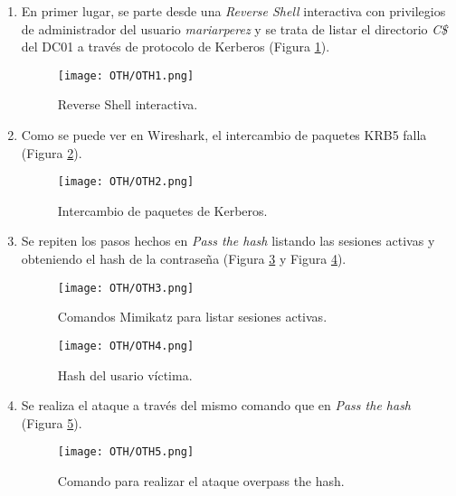 \begin{enumerate}
\item En primer lugar, se parte desde una {\it Reverse Shell} interactiva con privilegios de administrador del usuario {\it mariarperez} y se trata de listar el directorio {\it C\$} del DC01 a través de protocolo de Kerberos (Figura \ref{OTH1}).
\begin{figure}[H] %
\begin{center}
\texttt{[image: OTH/OTH1.png]}
\end{center}
\caption{Reverse Shell interactiva.}
\label{OTH1}
\end{figure}

\item Como se puede ver en Wireshark, el intercambio de paquetes KRB5 falla (Figura \ref{OTH2}).
\begin{figure}[H] %
\begin{center}
\texttt{[image: OTH/OTH2.png]}
\end{center}
\caption{Intercambio de paquetes de Kerberos.}
\label{OTH2}
\end{figure}

\item Se repiten los pasos hechos en {\it Pass the hash} listando las sesiones activas y obteniendo el hash de la contraseña (Figura \ref{OTH3} y Figura \ref{OTH4}).
\begin{figure}[H] %
\begin{center}
\texttt{[image: OTH/OTH3.png]}
\end{center}
\caption{Comandos Mimikatz para listar sesiones activas.}
\label{OTH3}
\end{figure}

\begin{figure}[H] %
\begin{center}
\texttt{[image: OTH/OTH4.png]}
\end{center}
\caption{Hash del usario víctima.}
\label{OTH4}
\end{figure}

\item Se realiza el ataque a través del mismo comando que en {\it Pass the hash} (Figura \ref{OTH5}).
\begin{figure}[H] %
\begin{center}
\texttt{[image: OTH/OTH5.png]}
\end{center}
\caption{Comando para realizar el ataque overpass the hash.}
\label{OTH5}
\end{figure}


\end{enumerate}
